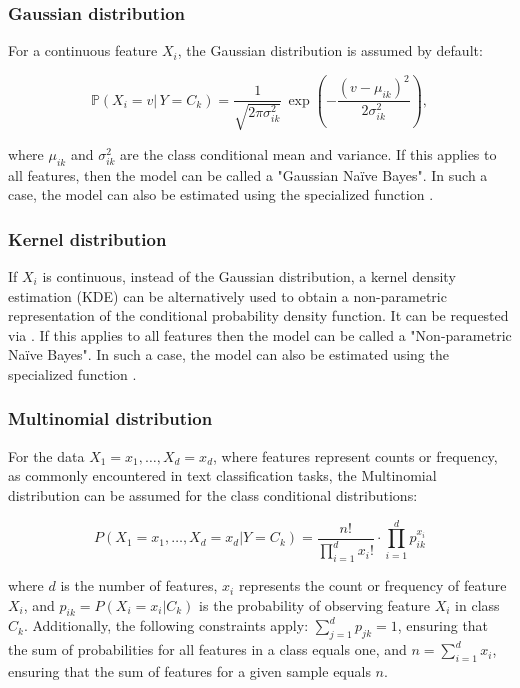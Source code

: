 \documentclass{article}\usepackage[]{graphicx}\usepackage[]{xcolor}
\begin{document}
\subsubsection{Gaussian distribution}

For a continuous feature $X_i$, the Gaussian distribution is assumed by default:

$$\mathbb{P}(X_i = v | \, Y = C_k) = \frac{1}{\sqrt{2 \pi \sigma^2_{ik}}} \, \exp \left(- \frac{(v - \mu_{ik})^2}{2 \sigma^2_{ik}}\right),$$

where $\mu_{ik}$ and $\sigma^2_{ik}$ are the class conditional mean and variance. If this applies to all features, then the model can be called a "Gaussian Na\"ive Bayes". In such a case, the model can also be estimated using the specialized function \textcolor{darkgreen}{{}}.

\subsubsection{Kernel distribution}

If $X_i$ is continuous, instead of the Gaussian distribution, a kernel density estimation (KDE) can be alternatively used to obtain a non-parametric representation of the conditional probability density function. It can be requested via \textcolor{darkgreen}{{}}. If this applies to all features then the model can be called a "Non-parametric Na\"ive Bayes". In such a case, the model can also be estimated using the specialized function \textcolor{darkgreen}{{}}.

\subsubsection{Multinomial distribution}

For the data $X_1 = x_1, \ldots, X_d = x_d$, where features represent counts or frequency, as commonly encountered in text classification tasks, the Multinomial distribution can be assumed for the class conditional distributions:

\[
P(X_1 = x_1, \ldots, X_d = x_d | Y = C_k) = \frac{n!}{\prod_{i=1}^{d} x_i!} \cdot \prod_{i=1}^{d} p_{ik}^{x_i}
\]

where $d$ is the number of features, $x_i$ represents the count or frequency of feature $X_i$, and $p_{ik} = P(X_i=x_i | C_k)$ is the probability of observing feature $X_i$ in class $C_k$. Additionally, the following constraints apply: $\sum_{j=1}^d p_{jk}=1$, ensuring that the sum of probabilities for all features in a class equals one, and $n = \sum_{i=1}^d x_i$, ensuring that the sum of features for a given sample equals $n$.
\end{document}
